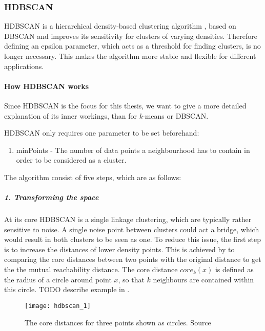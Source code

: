 \subsubsection{HDBSCAN}
\label{subsubsec:3_hdbscan}

HDBSCAN is a hierarchical density-based clustering algorithm \cite{McInnes2017},
based on DBSCAN and improves its sensitivity for clusters of varying densities.
Therefore defining an epsilon parameter, which acts as a threshold for finding clusters, is no longer necessary.
This makes the algorithm more stable and flexible for different applications.

\paragraph{How HDBSCAN works}
Since HDBSCAN is the focus for this thesis, we want to give a more detailed explanation of its inner workings,
than for \textit{k}-means or DBSCAN.

HDBSCAN only requires one parameter to be set beforehand:

\begin{enumerate}
    \item minPoints - The number of data points a neighbourhood has to contain in order to be considered as a cluster.
\end{enumerate}

The algorithm consist of five steps, which are as follows: 

\subparagraph{1. Transforming the space}
At its core HDBSCAN is a single linkage clustering, which are typically rather sensitive to noise.
A single noise point between clusters could act a bridge, which would result in both clusters to be seen as one.
To reduce this issue, the first step is to increase the distances of lower density points.
This is achieved by to comparing the core distances between two points with the original distance
to get the the mutual reachability distance.
The core distance $core_k(x)$ is defined as the radius of a circle around point $x$,
so that $k$ neighbours are contained within this circle.
TODO describe example in .

\begin{figure}[h]
    \centering
    \texttt{[image: hdbscan\_1]}
    \caption{The core distances for three points shown as circles. Source\cite{how_hdbscan_works}}
    \label{fig:hdbscan_1}
\end{figure}

